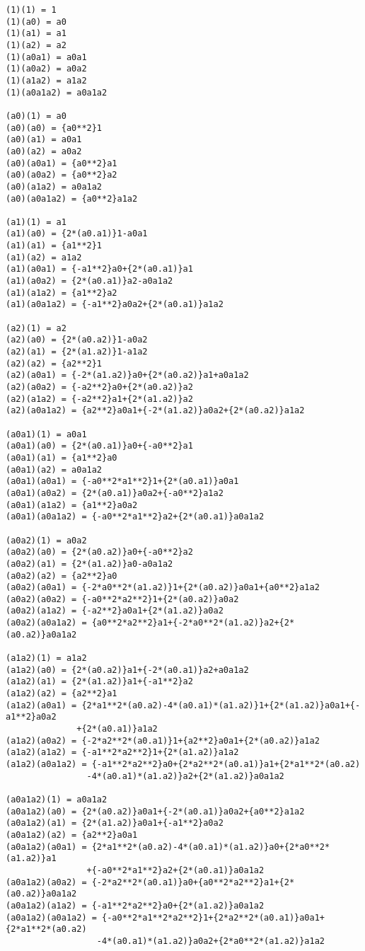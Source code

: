 \documentclass{article}
\begin{document}
{\small
\begin{verbatim}
(1)(1) = 1
(1)(a0) = a0
(1)(a1) = a1
(1)(a2) = a2
(1)(a0a1) = a0a1
(1)(a0a2) = a0a2
(1)(a1a2) = a1a2
(1)(a0a1a2) = a0a1a2

(a0)(1) = a0
(a0)(a0) = {a0**2}1
(a0)(a1) = a0a1
(a0)(a2) = a0a2
(a0)(a0a1) = {a0**2}a1
(a0)(a0a2) = {a0**2}a2
(a0)(a1a2) = a0a1a2
(a0)(a0a1a2) = {a0**2}a1a2

(a1)(1) = a1
(a1)(a0) = {2*(a0.a1)}1-a0a1
(a1)(a1) = {a1**2}1
(a1)(a2) = a1a2
(a1)(a0a1) = {-a1**2}a0+{2*(a0.a1)}a1
(a1)(a0a2) = {2*(a0.a1)}a2-a0a1a2
(a1)(a1a2) = {a1**2}a2
(a1)(a0a1a2) = {-a1**2}a0a2+{2*(a0.a1)}a1a2

(a2)(1) = a2
(a2)(a0) = {2*(a0.a2)}1-a0a2
(a2)(a1) = {2*(a1.a2)}1-a1a2
(a2)(a2) = {a2**2}1
(a2)(a0a1) = {-2*(a1.a2)}a0+{2*(a0.a2)}a1+a0a1a2
(a2)(a0a2) = {-a2**2}a0+{2*(a0.a2)}a2
(a2)(a1a2) = {-a2**2}a1+{2*(a1.a2)}a2
(a2)(a0a1a2) = {a2**2}a0a1+{-2*(a1.a2)}a0a2+{2*(a0.a2)}a1a2

(a0a1)(1) = a0a1
(a0a1)(a0) = {2*(a0.a1)}a0+{-a0**2}a1
(a0a1)(a1) = {a1**2}a0
(a0a1)(a2) = a0a1a2
(a0a1)(a0a1) = {-a0**2*a1**2}1+{2*(a0.a1)}a0a1
(a0a1)(a0a2) = {2*(a0.a1)}a0a2+{-a0**2}a1a2
(a0a1)(a1a2) = {a1**2}a0a2
(a0a1)(a0a1a2) = {-a0**2*a1**2}a2+{2*(a0.a1)}a0a1a2

(a0a2)(1) = a0a2
(a0a2)(a0) = {2*(a0.a2)}a0+{-a0**2}a2
(a0a2)(a1) = {2*(a1.a2)}a0-a0a1a2
(a0a2)(a2) = {a2**2}a0
(a0a2)(a0a1) = {-2*a0**2*(a1.a2)}1+{2*(a0.a2)}a0a1+{a0**2}a1a2
(a0a2)(a0a2) = {-a0**2*a2**2}1+{2*(a0.a2)}a0a2
(a0a2)(a1a2) = {-a2**2}a0a1+{2*(a1.a2)}a0a2
(a0a2)(a0a1a2) = {a0**2*a2**2}a1+{-2*a0**2*(a1.a2)}a2+{2*(a0.a2)}a0a1a2

(a1a2)(1) = a1a2
(a1a2)(a0) = {2*(a0.a2)}a1+{-2*(a0.a1)}a2+a0a1a2
(a1a2)(a1) = {2*(a1.a2)}a1+{-a1**2}a2
(a1a2)(a2) = {a2**2}a1
(a1a2)(a0a1) = {2*a1**2*(a0.a2)-4*(a0.a1)*(a1.a2)}1+{2*(a1.a2)}a0a1+{-a1**2}a0a2
              +{2*(a0.a1)}a1a2
(a1a2)(a0a2) = {-2*a2**2*(a0.a1)}1+{a2**2}a0a1+{2*(a0.a2)}a1a2
(a1a2)(a1a2) = {-a1**2*a2**2}1+{2*(a1.a2)}a1a2
(a1a2)(a0a1a2) = {-a1**2*a2**2}a0+{2*a2**2*(a0.a1)}a1+{2*a1**2*(a0.a2)
                -4*(a0.a1)*(a1.a2)}a2+{2*(a1.a2)}a0a1a2

(a0a1a2)(1) = a0a1a2
(a0a1a2)(a0) = {2*(a0.a2)}a0a1+{-2*(a0.a1)}a0a2+{a0**2}a1a2
(a0a1a2)(a1) = {2*(a1.a2)}a0a1+{-a1**2}a0a2
(a0a1a2)(a2) = {a2**2}a0a1
(a0a1a2)(a0a1) = {2*a1**2*(a0.a2)-4*(a0.a1)*(a1.a2)}a0+{2*a0**2*(a1.a2)}a1
                +{-a0**2*a1**2}a2+{2*(a0.a1)}a0a1a2
(a0a1a2)(a0a2) = {-2*a2**2*(a0.a1)}a0+{a0**2*a2**2}a1+{2*(a0.a2)}a0a1a2
(a0a1a2)(a1a2) = {-a1**2*a2**2}a0+{2*(a1.a2)}a0a1a2
(a0a1a2)(a0a1a2) = {-a0**2*a1**2*a2**2}1+{2*a2**2*(a0.a1)}a0a1+{2*a1**2*(a0.a2)
                  -4*(a0.a1)*(a1.a2)}a0a2+{2*a0**2*(a1.a2)}a1a2
\end{verbatim}
}
\end{document}
